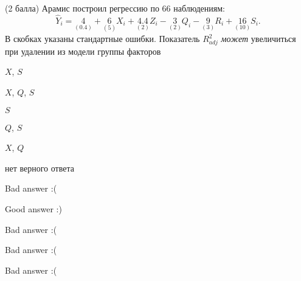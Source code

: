 
\begin{question}
(2 балла) Арамис построил регрессию по 66 наблюдениям: \[
\hat Y_i = \underset{(0.4)}{4} + \underset{(5)}{6}X_i + \underset{(2)}{4.4} Z_i - \underset{(2)}{3} Q_i - \underset{(3)}{9} R_i + \underset{(10)}{16} S_i.
\]
В скобках указаны стандартные ошибки.
Показатель \(R^2_{adj}\) \emph{может} увеличиться при удалении из
модели группы факторов
\begin{answerlist}
  \item \(X\), \(S\)
  \item \(X\), \(Q\), \(S\)
  \item \(S\)
  \item \(Q\), \(S\)
  \item \(X\), \(Q\)
  \item нет верного ответа
\end{answerlist}
\end{question}

\begin{solution}
\begin{answerlist}
  \item Bad answer :(
  \item Good answer :)
  \item Bad answer :(
  \item Bad answer :(
  \item Bad answer :(
\end{answerlist}
\end{solution}
